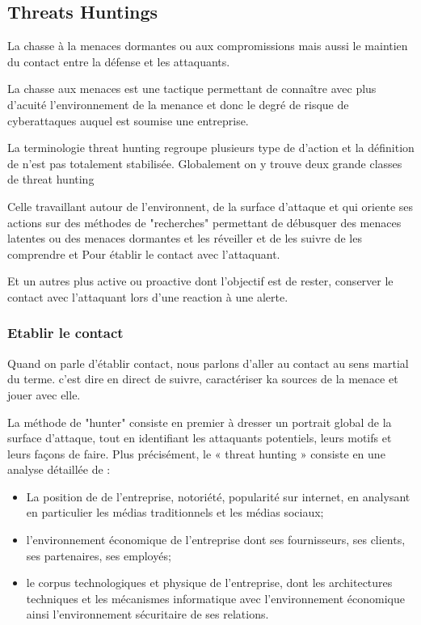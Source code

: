 \subsection{Threats Huntings}

La chasse à la menaces dormantes ou aux compromissions  mais aussi le maintien du contact entre la défense et les attaquants.

La chasse aux menaces est une tactique permettant de connaître avec plus d'acuité l'environnement de la menance et donc  le degré de risque de cyberattaques auquel est soumise une entreprise. 


La terminologie threat hunting regroupe plusieurs type de d'action et la définition de n'est pas totalement stabilisée. Globalement on y trouve deux grande classes de threat hunting

Celle travaillant autour de l'environnent, de la surface d'attaque et qui oriente ses actions sur des méthodes de "recherches" permettant de débusquer des menaces latentes ou des menaces dormantes et les réveiller et de les suivre de les comprendre et Pour établir le contact avec l'attaquant.

Et un autres plus active ou proactive dont l'objectif est de rester, conserver le contact avec l'attaquant lors d'une reaction à une alerte.
 
\subsubsection{Etablir le contact}

Quand on parle d'établir contact, nous parlons d'aller au contact au sens martial du terme. c'est dire en direct de suivre, caractériser ka sources de la menace et jouer avec elle.

La méthode de "hunter" consiste en premier à dresser un portrait global de la surface d’attaque, tout en identifiant les attaquants potentiels, leurs motifs et leurs façons de faire. Plus précisément, le « threat hunting » consiste en une analyse détaillée de :

\begin{itemize}
	\item La position de de l’entreprise,  notoriété, popularité sur internet, en analysant en particulier  les médias traditionnels et les médias sociaux;
	\item l'environnement économique de l’entreprise dont ses fournisseurs, ses clients, ses partenaires, ses employés;
	\item le corpus technologiques et physique de l'entreprise, dont les architectures techniques et les mécanismes informatique avec l'environnement économique ainsi l'environnement sécuritaire de ses relations.
\end{itemize}



